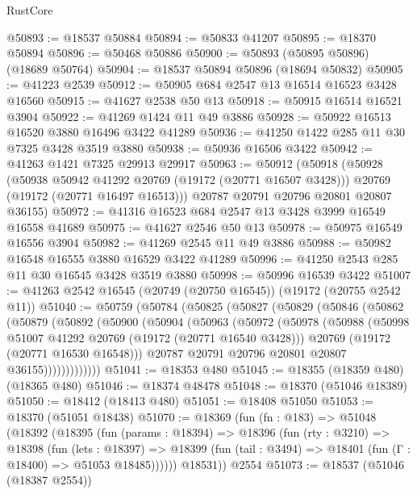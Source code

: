 \begin{lexlean}{RustCore}
\begin{coremodule}
@50893 := @18537 @50884
@50894 := @50833 @41207
@50895 := @18370 @50894
@50896 := @50468 @50886
@50900 := @50893 (@50895 @50896) (@18689 @50764)
@50904 := @18537 @50894 @50896 (@18694 @50832)
@50905 := @41223 @2539
@50912 := @50905 @684 @2547 @13 @16514 @16523 @3428 @16560
@50915 := @41627 @2538 @50 @13
@50918 := @50915 @16514 @16521 @3904
@50922 := @41269 @1424 @11 @49 @3886
@50928 := @50922 @16513 @16520 @3880 @16496 @3422 @41289
@50936 := @41250 @1422 @285 @11 @30 @7325 @3428 @3519 @3880
@50938 := @50936 @16506 @3422
@50942 := @41263 @1421 @7325 @29913 @29917
@50963 := @50912
    (@50918
      (@50928
        (@50938 @50942 @41292 @20769 (@19172 (@20771 @16507 @3428)))
        @20769
        (@19172 (@20771 @16497 @16513)))
      @20787
      @20791
      @20796
      @20801
      @20807
      @36155)
@50972 := @41316 @16523 @684 @2547 @13 @3428 @3999 @16549 @16558 @41689
@50975 := @41627 @2546 @50 @13
@50978 := @50975 @16549 @16556 @3904
@50982 := @41269 @2545 @11 @49 @3886
@50988 := @50982 @16548 @16555 @3880 @16529 @3422 @41289
@50996 := @41250 @2543 @285 @11 @30 @16545 @3428 @3519 @3880
@50998 := @50996 @16539 @3422
@51007 := @41263 @2542 @16545 (@20749 (@20750 @16545)) (@19172 (@20755 @2542 @11))
@51040 := @50759
    (@50784
      (@50825
        (@50827
          (@50829
            (@50846
              (@50862
                (@50879
                  (@50892
                    (@50900
                      (@50904
                        (@50963
                          (@50972
                            (@50978
                              (@50988
                                (@50998 @51007 @41292 @20769 (@19172 (@20771 @16540 @3428)))
                                @20769
                                (@19172 (@20771 @16530 @16548)))
                              @20787
                              @20791
                              @20796
                              @20801
                              @20807
                              @36155)))))))))))))
@51041 := @18353 @480
@51045 := @18355 (@18359 @480) (@18365 @480)
@51046 := @18374 @48478
@51048 := @18370 (@51046 @18389)
@51050 := @18412 (@18413 @480)
@51051 := @18408 @51050
@51053 := @18370 (@51051 @18438)
@51070 := @18369
    (fun (fn : @183) =>
    @51048
      (@18392
        (@18395
          (fun (params : @18394) =>
          @18396
            (fun (rty : @3210) =>
            @18398
              (fun (lets : @18397) =>
              @18399 (fun (tail : @3494) => @18401 (fun (Γ : @18400) => @51053 @18485))))))
        @18531))
    @2554
@51073 := @18537 (@51046 (@18387 @2554))

\end{coremodule}
\end{lexlean}
